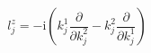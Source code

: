 \begin{equation}
l^z_j = -{\mathrm i} \left(k^1_j\frac{\partial}{\partial k^2_j}
-k^2_j\frac{\partial}{\partial k^1_j}\right)
\end{equation}

